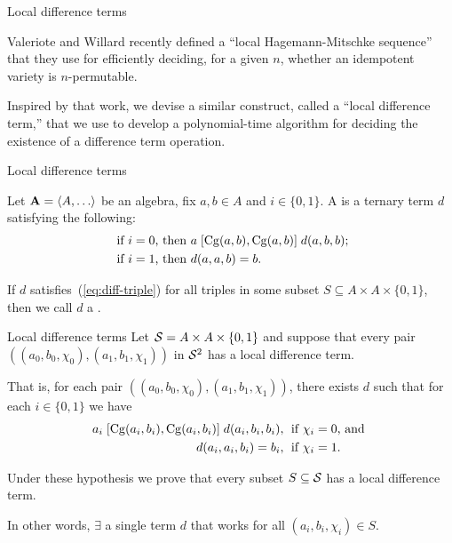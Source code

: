 \documentclass[12pt,xcolor=dvipsnames%
   ]{beamer}
\renewcommand{\cite}[1]{\relax}
\newcommand{\bigpause}{\pause\bigskip}
\begin{document}
\begin{frame}{Local difference terms}

Valeriote and Willard recently defined %
a ``local Hagemann-Mitschke sequence'' that they use for
efficiently deciding, for a given $n$, whether an idempotent
variety is $n$-permutable. 

  \bigskip

  Inspired by that work, we devise a similar construct, called
  a ``local difference term,'' that we use to develop a polynomial-time
  algorithm for deciding the existence of a difference term operation.

\end{frame}
\begin{frame}{Local difference terms}

  Let $\bA=\< A, \dots\>$ be an algebra, fix $a, b \in A$ and
  $i \in \{0,1\}$.
  A  is a ternary term $d$ satisfying the following:
  \begin{align}
    \text{ if $i=0$, then } & a \mathrel{[\operatorname{Cg}(a,b), \operatorname{Cg}(a,b)]} d(a,b,b); \label{eq:diff-triple}\\
    \text{ if $i=1$, then } &d(a,a,b) = b. \nonumber
  \end{align}

  \bigpause
  If $d$ satisfies~(\ref{eq:diff-triple}) for all triples
  in some subset $S\subseteq A \times A \times \{0,1\}$, then we call $d$
  a .
\end{frame}

\begin{frame}{Local difference terms}
  Let 
  $\mathcal{S} = A \times A \times \{0,1\}$ and
  suppose that every pair
  $((a_0, b_0, \chi_0), (a_1, b_1, \chi_1))$
  in $\mathcal{S}^2$ has a local difference term.

  \bigpause
  That is, for each pair $((a_0, b_0, \chi_0), (a_1, b_1, \chi_1))$, there exists
  $d$ such that for each $i \in \{0,1\}$ we have
  \begin{align}
    a_i \comr{\Cg(a_i,b_i)} d(a_i,b_i,b_i), & \;
  \text{ if $\chi_i=0$, and }  \label{eq:d-trip-i1}\\
  d(a_i,a_i,b_i) =b_i, & \;
  \text{ if $\chi_i=1$.}\label{eq:d-trip-i2} %
  \end{align}
  
  \bigpause
  Under these hypothesis we prove that every subset $S\subseteq \mathcal{S}$
  has a local difference term.

  \vskip2mm
  In other words, $\exists$ a single term $d$ that works 
  for all $(a_i, b_i, \chi_i) \in S$.
\end{frame}
\end{document}
